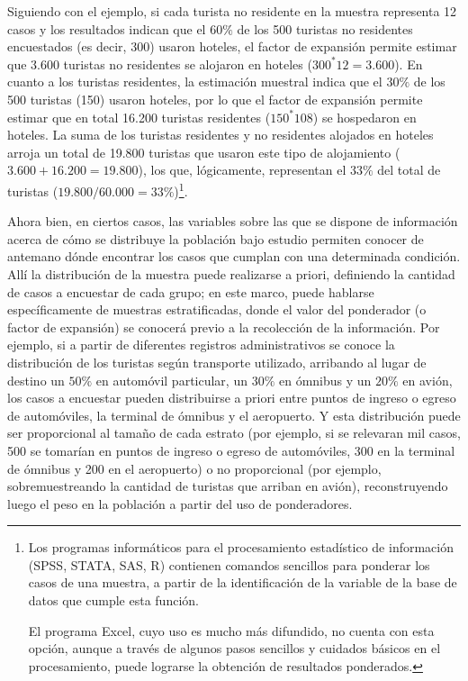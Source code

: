 \documentclass[
]{book}
\begin{document}
Siguiendo con el ejemplo, si cada turista no residente en la muestra representa 12 casos y los resultados indican que el \(60\%\) de los 500 turistas no residentes encuestados (es decir, 300) usaron hoteles, el factor de expansión permite estimar que 3.600 turistas no residentes se alojaron en hoteles (\(300^*12=3.600\)). En cuanto a los turistas residentes, la estimación muestral indica que el \(30\%\) de los 500 turistas (150) usaron hoteles, por lo que el factor de expansión permite estimar que en total 16.200 turistas residentes (\(150^*108\)) se hospedaron en hoteles. La suma de los turistas residentes y no residentes alojados en hoteles arroja un total de 19.800 turistas que usaron este tipo de alojamiento (\(3.600+16.200=19.800\)), los que, lógicamente, representan el \(33\%\) del total de turistas (\(19.800/60.000=33\%\))\footnote{Los programas informáticos para el procesamiento estadístico de información (SPSS, STATA, SAS, R) contienen comandos sencillos para ponderar los casos de una muestra, a partir de la identificación de la variable de la base de datos que cumple esta función.

  El programa Excel, cuyo uso es mucho más difundido, no cuenta con esta opción, aunque a través de algunos pasos sencillos y cuidados básicos en el procesamiento, puede lograrse la obtención de resultados ponderados.}.

Ahora bien, en ciertos casos, las variables sobre las que se dispone de información acerca de cómo se distribuye la población bajo estudio permiten conocer de antemano dónde encontrar los casos que cumplan con una determinada condición. Allí la distribución de la muestra puede realizarse a priori, definiendo la cantidad de casos a encuestar de cada grupo; en este marco, puede hablarse específicamente de muestras estratificadas, donde el valor del ponderador (o factor de expansión) se conocerá previo a la recolección de la información. Por ejemplo, si a partir de diferentes registros administrativos se conoce la distribución de los turistas según transporte utilizado, arribando al lugar de destino un \(50\%\) en automóvil particular, un \(30\%\) en ómnibus y un \(20\%\) en avión, los casos a encuestar pueden distribuirse a priori entre puntos de ingreso o egreso de automóviles, la terminal de ómnibus y el aeropuerto. Y esta distribución puede ser proporcional al tamaño de cada estrato (por ejemplo, si se relevaran mil casos, 500 se tomarían en puntos de ingreso o egreso de automóviles, 300 en la terminal de ómnibus y 200 en el aeropuerto) o no proporcional (por ejemplo, sobremuestreando la cantidad de turistas que arriban en avión), reconstruyendo luego el peso en la población a partir del uso de ponderadores.
\end{document}
